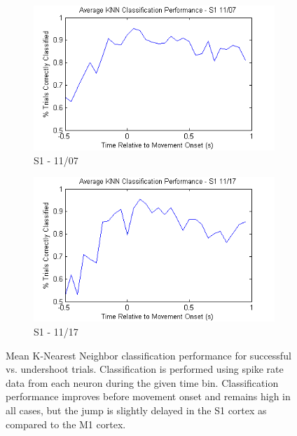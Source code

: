 \documentclass[11pt,a4paper]{article}
\begin{document}
\begin{figure}[h]
{\begin{subfigure}[b]{0.75\textwidth}
                \includegraphics[width=\textwidth]{knn-s1-07-24}
                \caption{\large S1 - 11/07 \\}
                \label{fig:knn-s1-07-24}
        \end{subfigure}
        \begin{subfigure}[b]{0.75\textwidth}
                \centering
                \includegraphics[width=\textwidth]{knn-s1-17-24}
                \caption{\large S1 - 11/17 \\}
                \label{fig:knn-s1-17-24}
        \end{subfigure}}
        \caption{Mean K-Nearest Neighbor classification performance for successful vs. undershoot trials. Classification is performed using spike rate data from each neuron during the given time bin. Classification performance improves before movement onset and remains high in all cases, but the jump is slightly delayed in the S1 cortex as compared to the M1 cortex.}\label{fig:knn-24}
\end{figure}
\end{document}
